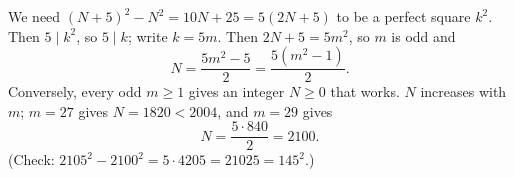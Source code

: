 We need $(N+5)^2-N^2=10N+25=5(2N+5)$ to be a perfect square $k^2$. Then $5\mid k^2$, so $5\mid k$; write $k=5m$. Then $2N+5=5m^2$, so $m$ is odd and
\[N=\dfrac{5m^2-5}{2}=\dfrac{5\left(m^2-1\right)}{2}.\]
Conversely, every odd $m\ge1$ gives an integer $N\ge0$ that works. $N$ increases with $m$; $m=27$ gives $N=1820<2004$, and $m=29$ gives
\[N=\dfrac{5\cdot840}{2}=\boxed{2100}.\]
(Check: $2105^2-2100^2=5\cdot4205=21025=145^2$.)
